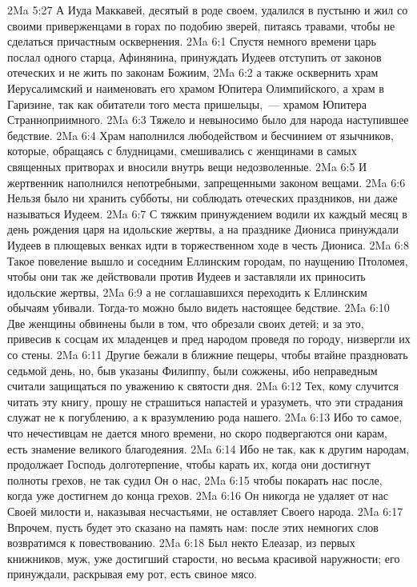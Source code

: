 \vs 2Ma 5:27 А Иуда Маккавей, десятый в роде своем, удалился в пустыню и жил со своими приверженцами в горах по подобию зверей, питаясь травами, чтобы не сделаться причастным осквернения.
\vs 2Ma 6:1 Спустя немного времени царь послал одного старца, Афинянина, принуждать Иудеев отступить от законов отеческих и не жить по законам Божиим,
\vs 2Ma 6:2 а также осквернить храм Иерусалимский и наименовать его храмом Юпитера Олимпийского, а храм в Гаризине, так как обитатели того места пришельцы,~--- храмом Юпитера Странноприимного.
\vs 2Ma 6:3 Тяжело и невыносимо было для народа наступившее бедствие.
\vs 2Ma 6:4 Храм наполнился любодейством и бесчинием от язычников, которые, обращаясь с блудницами, смешивались с женщинами в самых священных притворах и вносили внутрь вещи недозволенные.
\vs 2Ma 6:5 И жертвенник наполнился непотребными, запрещенными законом вещами.
\vs 2Ma 6:6 Нельзя было ни хранить субботы, ни соблюдать отеческих праздников, ни даже называться Иудеем.
\vs 2Ma 6:7 С тяжким принуждением водили их каждый месяц в день рождения царя на идольские жертвы, а на празднике Диониса принуждали Иудеев в плющевых венках идти в торжественном ходе в честь Диониса.
\vs 2Ma 6:8 Такое повеление вышло и соседним Еллинским городам, по наущению Птоломея, чтобы они так же действовали против Иудеев и заставляли их приносить идольские жертвы,
\vs 2Ma 6:9 а не соглашавшихся переходить к Еллинским обычаям убивали. Тогда-то можно было видеть настоящее бедствие.
\vs 2Ma 6:10 Две женщины обвинены были в том, что обрезали своих детей; и за это, привесив к сосцам их младенцев и пред народом проведя по городу, низвергли их со стены.
\vs 2Ma 6:11 Другие бежали в ближние пещеры, чтобы втайне праздновать седьмой день, но, быв указаны Филиппу, были сожжены, ибо неправедным считали защищаться по уважению к святости дня.
\rsbpar\vs 2Ma 6:12 Тех, кому случится читать эту книгу, прошу не страшиться напастей и уразуметь, что эти страдания служат не к погублению, а к вразумлению рода нашего.
\vs 2Ma 6:13 Ибо то самое, что нечестивцам не дается много времени, но скоро подвергаются они карам, есть знамение великого благодеяния.
\vs 2Ma 6:14 Ибо не так, как к другим народам, продолжает Господь долготерпение, чтобы карать их, когда они достигнут полноты грехов, не так судил Он о нас,
\vs 2Ma 6:15 чтобы покарать нас после, когда уже достигнем до конца грехов.
\vs 2Ma 6:16 Он никогда не удаляет от нас Своей милости и, наказывая несчастьями, не оставляет Своего народа.
\vs 2Ma 6:17 Впрочем, пусть будет это сказано на память нам: после этих немногих слов возвратимся к повествованию.
\rsbpar\vs 2Ma 6:18 Был некто Елеазар, из первых книжников, муж, уже достигший старости, но весьма красивой наружности; его принуждали, раскрывая ему рот, есть свиное мясо.
